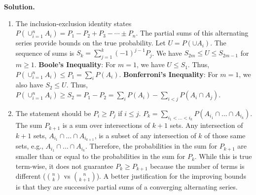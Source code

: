 \noindent\textbf{Solution.}
\begin{enumerate}[label=(\alph*)]
    \item The inclusion-exclusion identity states $P(\cup_{i=1}^{n} A_i) = P_1 - P_2 + P_3 - \cdots \pm P_n$. The partial sums of this alternating series provide bounds on the true probability. Let $U = P(\cup A_i)$.
    \vspace{1ex} %
    The sequence of sums is $S_k = \sum_{j=1}^k (-1)^{j-1} P_j$. We have $S_{2m} \le U \le S_{2m-1}$ for $m \ge 1$.
    \vspace{1ex} %
    \textbf{Boole's Inequality}: For $m=1$, we have $U \le S_1$. Thus, $P(\cup_{i=1}^{n} A_i) \leq P_1 = \sum_i P(A_i)$.
    \vspace{1ex} %
    \textbf{Bonferroni's Inequality}: For $m=1$, we also have $S_2 \le U$. Thus, $P(\cup_{i=1}^{n} A_i) \geq S_2 = P_1 - P_2 = \sum_i P(A_i) - \sum_{i<j} P(A_i \cap A_j)$.

    \item The statement should be $P_i \ge P_j$ if $i \le j$.
    $P_k = \sum_{i_1 < \dots < i_k} P(A_{i_1} \cap \dots \cap A_{i_k})$. The sum $P_{k+1}$ is a sum over intersections of $k+1$ sets. Any intersection of $k+1$ sets, $A_{i_1} \cap \dots \cap A_{i_{k+1}}$, is a subset of any intersection of $k$ of those same sets, e.g., $A_{i_1} \cap \dots \cap A_{i_k}$. Therefore, the probabilities in the sum for $P_{k+1}$ are smaller than or equal to the probabilities in the sum for $P_k$. While this is true term-wise, it does not guarantee $P_k \ge P_{k+1}$ because the number of terms is different ($\binom{n}{k}$ vs $\binom{n}{k+1}$). A better justification for the improving bounds is that they are successive partial sums of a converging alternating series.


\end{enumerate}
